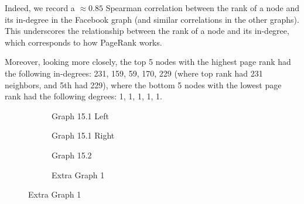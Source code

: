 \documentclass{article}
\begin{document}
\begin{enumerate}
    Indeed, we record a $\approx 0.85$ Spearman correlation between the rank of a node and its in-degree in the Facebook graph (and similar correlations in the other graphs). This underscores the relationship between the rank of a node and its in-degree, which corresponds to how PageRank works.
    
    Moreover, looking more closely, the top 5 nodes with the highest page rank had the following in-degrees: 231, 159, 59, 170, 229 (where top rank had 231 neighbors, and 5th had 229), where the bottom 5 nodes with the lowest page rank had the following degrees: 1, 1, 1, 1, 1.

    \begin{figure}
        \centering
        \begin{subfigure}[t]{0.45\textwidth}
            \centering
            \resizebox{\textwidth}{!}{%
                
            }
            \caption{Graph 15.1 Left}
        \end{subfigure}
        \hfill
        \begin{subfigure}[t]{0.45\textwidth}
            \centering
            \resizebox{\textwidth}{!}{%
                
            }
            \caption{Graph 15.1 Right}
        \end{subfigure}
        \par\bigskip %
    
        \begin{subfigure}[t]{0.45\textwidth}
            \centering
            \resizebox{\textwidth}{!}{%
                
            }
            \caption{Graph 15.2}
        \end{subfigure}
        \hfill
        \begin{subfigure}[t]{0.45\textwidth}
            \centering
            \resizebox{\textwidth}{!}{%
                
            }
            \caption{Extra Graph 1}
        \end{subfigure}
        \par\bigskip %
    

\end{figure}
\end{enumerate}
\end{document}
